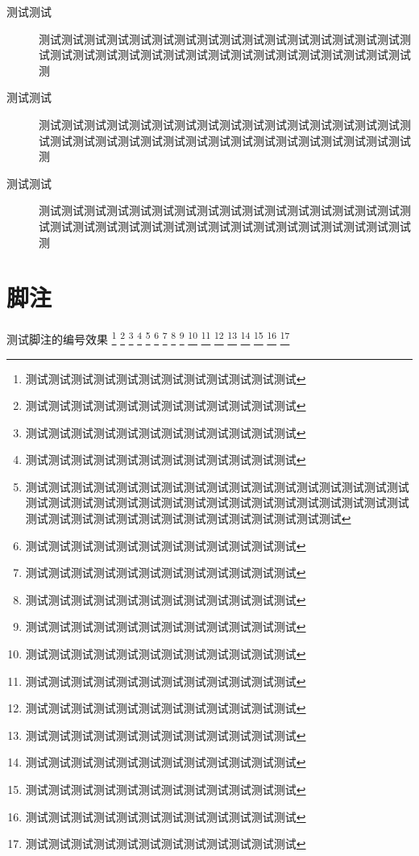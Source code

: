 \documentclass{njuthesis}
\begin{document}
\begin{description}
    \item[测试测试] 测试测试测试测试测试测试测试测试测试测试测试测试测试测试测试测试测试测试测试测试测试测试测试测试测试测试测试测试测试测试测试测试测试测
    \item[测试测试] 测试测试测试测试测试测试测试测试测试测试测试测试测试测试测试测试测试测试测试测试测试测试测试测试测试测试测试测试测试测试测试测试测试测
    \item[测试测试] 测试测试测试测试测试测试测试测试测试测试测试测试测试测试测试测试测试测试测试测试测试测试测试测试测试测试测试测试测试测试测试测试测试测
\end{description}

\chapter{脚注}

测试脚注的编号效果%
\footnote{测试测试测试测试测试测试测试测试测试测试测试测试}%
\footnote{测试测试测试测试测试测试测试测试测试测试测试测试}%
\footnote{测试测试测试测试测试测试测试测试测试测试测试测试}%
\footnote{测试测试测试测试测试测试测试测试测试测试测试测试}%
\footnote{测试测试测试测试测试测试测试测试测试测试测试测试测试测试测试测试测试测试测试测试测试测试测试测试测试测试测试测试测试测试测试测试测试测试测试测试测试测试测试测试测试测试测试测试测试测试测试测试}%
\footnote{测试测试测试测试测试测试测试测试测试测试测试测试}%
\footnote{测试测试测试测试测试测试测试测试测试测试测试测试}%
\footnote{测试测试测试测试测试测试测试测试测试测试测试测试}%
\footnote{测试测试测试测试测试测试测试测试测试测试测试测试}%
\footnote{测试测试测试测试测试测试测试测试测试测试测试测试}%
\footnote{测试测试测试测试测试测试测试测试测试测试测试测试}%
\footnote{测试测试测试测试测试测试测试测试测试测试测试测试}%
\footnote{测试测试测试测试测试测试测试测试测试测试测试测试}%
\footnote{测试测试测试测试测试测试测试测试测试测试测试测试}%
\footnote{测试测试测试测试测试测试测试测试测试测试测试测试}%
\footnote{测试测试测试测试测试测试测试测试测试测试测试测试}%
\footnote{测试测试测试测试测试测试测试测试测试测试测试测试}%


% 



\printbibliography



\appendix


% 
\end{document}
